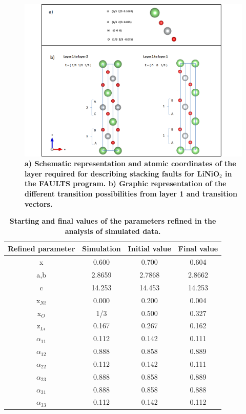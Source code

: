 \begin{figure}
\begin{center}
\includegraphics [width=6in]{description.png}
\caption{\bf  a) Schematic representation and atomic coordinates of the layer required for describing stacking faults for LiNiO$_2$ in the FAULTS program. b) Graphic representation of the different transition possibilities from layer 1 and transition vectors.}
\label{esquemacapes}
\end{center}
\end{figure}


\begin{table}
\begin{center}
\begin{tabular}{|c|c|c|c|}
\hline
Refined parameter & Simulation & Initial value & Final value \\
\hline
x & 0.600 & 0.700 & 0.604 \\
\hline
a,b & 2.8659 & 2.7868 & 2.8662 \\
\hline
c & 14.253 & 14.453 & 14.253 \\
\hline
x$_{Ni}$ & 0.000 & 0.200 & 0.004 \\
\hline
x$_{O}$ & 1/3 & 0.500 & 0.327 \\
\hline
z$_{Li}$ & 0.167	&0.267&	0.162 \\
\hline
$\alpha_{11}$ & 0.112&	0.142	&0.111\\
\hline
$\alpha_{12}$ & 0.888	&0.858&	0.889 \\
\hline
$\alpha_{22}$ & 0.112&	0.142	&0.111\\
\hline
$\alpha_{23}$ & 0.888	&0.858	&0.889 \\
\hline
$\alpha_{31}$ & 0.888&	0.858&	0.888 \\
\hline
$\alpha_{33}$ & 0.112&	0.142&	0.112\\
\hline

\end{tabular}
\caption{\textbf{Starting and final values of the parameters refined in the analysis of simulated data.}}
\label{taulasim}
\end{center}
\end{table}


